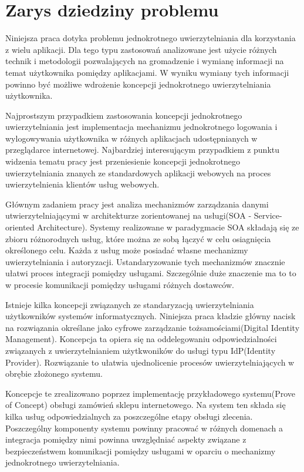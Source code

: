 \section{Zarys dziedziny problemu}
\label{sec:zarysDziedzinyProblemu}

Niniejsza praca dotyka problemu jednokrotnego uwierzytelniania dla korzystania z wielu aplikacji. Dla tego typu zastosowań analizowane jest użycie różnych technik i metodologii pozwalających na gromadzenie i wymianę informacji na temat użytkownika pomiędzy aplikacjami. W wyniku wymiany tych informacji powinno być możliwe wdrożenie koncepcji jednokrotnego uwierzytelniania użytkownika.

Najprostszym przypadkiem zastosowania koncepcji jednokrotnego uwierzytelniania jest implementacja mechanizmu jednokrotnego logowania i wylogowywania użytkownika w różnych aplikacjach udostępnianych w przeglądarce internetowej. Najbardziej interesującym przypadkiem z punktu widzenia tematu pracy jest przeniesienie koncepcji jednokrotnego uwierzytelniania znanych ze standardowych aplikacji webowych na proces uwierzytelnienia klientów usług webowych.

Głównym zadaniem pracy jest analiza mechanizmów zarządzania danymi utwierzytelniającymi w architekturze zorientowanej na usługi(SOA - Service-oriented Architecture). Systemy realizowane w paradygmacie SOA składają się ze zbioru różnorodnych usług, które można ze sobą łączyć w celu osiagnięcia określonego celu. Każda z usług może posiadać własne mechanizmy uwierzytelniania i autoryzacji. Ustandaryzowanie tych mechanizmów znacznie ułatwi proces integracji pomiędzy usługami. Szczególnie duże znaczenie ma to to w procesie komunikacji pomiędzy usługami różnych dostawców. 

Istnieje kilka koncepcji związanych ze standaryzacją uwierzytelniania użytkowników systemów informatycznych. Niniejsza praca kładzie główny nacisk na rozwiązania określane jako cyfrowe zarządzanie tożsamościami(Digital Identity Management). Koncepcja ta opiera się na oddelegowaniu odpowiedzialności związanych z uwierzytelnianiem użytkwoników do usługi typu IdP(Identity Provider). Rozwiązanie to ułatwia ujednolicenie procesów uwierzytelniających w obrębie złożonego systemu.

Koncepcje te zrealizowano poprzez implementację przykładowego systemu(Prove of Concept) obsługi zamówień sklepu internetowego. Na system ten składa się kilka usług odpowiedzialnych za poszczególne etapy obsługi zlecenia. Poszczególny komponenty systemu powinny pracować w różnych domenach a integracja pomiędzy nimi powinna uwzględniać aspekty związane z bezpieczeństwem komunikacji pomiędzy usługami w oparciu o mechanizmy jednokrotnego uwierzytelniania.
